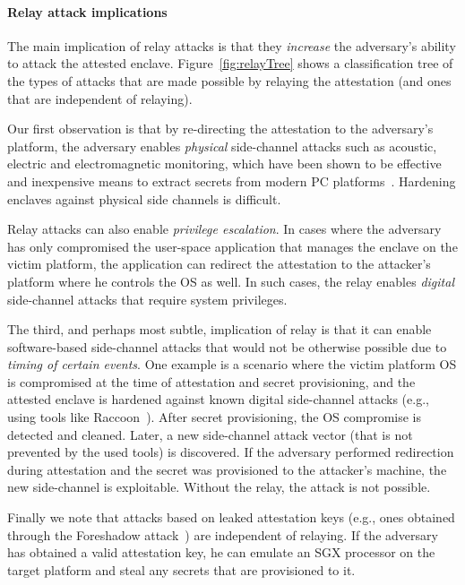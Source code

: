 \paragraph{Relay attack implications}
The main implication of relay attacks is that they \emph{increase} the adversary's ability to attack the attested enclave. Figure~\ref{fig:relayTree} shows a classification tree of the types of attacks that are made possible by relaying the attestation (and ones that are independent of relaying). 

Our first observation is that by re-directing the attestation to the adversary's platform, the adversary enables \emph{physical} side-channel attacks such as acoustic, electric and electromagnetic monitoring, which have been shown to be effective and inexpensive means to extract secrets from modern PC platforms~\cite{genkin2016physical}. Hardening enclaves against physical side channels is difficult. 

Relay attacks can also enable \emph{privilege escalation}. In cases where the adversary has only compromised the user-space application that manages the enclave on the victim platform, the application can redirect the attestation to the attacker's platform where he controls the OS as well. In such cases, the relay enables \emph{digital} side-channel attacks that require system privileges.

The third, and perhaps most subtle, implication of relay is that it can enable software-based side-channel attacks that would not be otherwise possible due to \emph{timing of certain events}. One example is a scenario where the victim platform OS is compromised at the time of attestation and secret provisioning, and the attested enclave is hardened against known digital side-channel attacks (e.g., using tools like Raccoon~\cite{raccoon}). After secret provisioning, the OS compromise is detected and cleaned. Later, a new side-channel attack vector (that is not prevented by the used tools) is discovered. If the adversary performed redirection during attestation and the secret was provisioned to the attacker's machine, the new side-channel is exploitable. Without the relay, the attack is not possible. 

Finally we note that attacks based on leaked attestation keys (e.g., ones obtained through the Foreshadow attack~\cite{van2018foreshadow}) are independent of relaying. If the adversary has obtained a valid attestation key, he can emulate an SGX processor on the target platform and steal any secrets that are provisioned to it.


